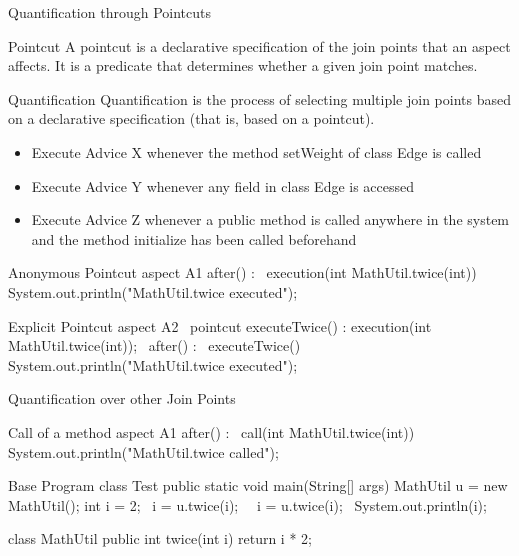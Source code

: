 \begin{frame}[fragile]{Quantification through Pointcuts}
	\begin{fancycolumns}[animation=none]
		\begin{definition}{Pointcut }
			A pointcut is a declarative specification of the join points that an aspect affects. It is a predicate that determines whether a given join point matches.
		\end{definition}
		\begin{definition}{Quantification }
			Quantification  is the process of selecting multiple join points based on a declarative specification (that is, based on a pointcut).
		\end{definition}
		\begin{example}{}
			\small
			\begin{itemize}
				\item Execute Advice X whenever the method setWeight of class Edge is called
				\item Execute Advice Y whenever any field in class Edge is accessed
				\item Execute Advice Z whenever a public method is called anywhere in the system and the method initialize has been called beforehand
			\end{itemize}
		\end{example}
	\nextcolumn
{\small
\begin{codetight}{Anonymous Pointcut}
aspect A1 {
	after() : ~execution(int MathUtil.twice(int))~ {
		System.out.println("MathUtil.twice executed");
	}
}
\end{codetight}			
\begin{codetight}{Explicit Pointcut}
aspect A2 {
	~pointcut executeTwice() : 
			execution(int MathUtil.twice(int));~
	after() : ~executeTwice()~ {
		System.out.println("MathUtil.twice executed");
	}
}
\end{codetight}	
}
	\end{fancycolumns}
\end{frame}

\begin{frame}[fragile]{Quantification over other Join Points}
	\begin{fancycolumns}[animation=none]
\begin{codetight}{Call of a method}
aspect A1 {
	after() : ~call(int MathUtil.twice(int))~ {
		System.out.println("MathUtil.twice called");
	}
}
\end{codetight}
	\nextcolumn
\begin{codetight}{Base Program}
class Test {
	public static void main(String[] args) {
		MathUtil u = new MathUtil();
		int i = 2;
		~i = u.twice(i);~
		~i = u.twice(i);~
		System.out.println(i);
	}
}

class MathUtil {
	public int twice(int i) {
		return i * 2;
	}
}
\end{codetight}	
	\end{fancycolumns}
\end{frame}

